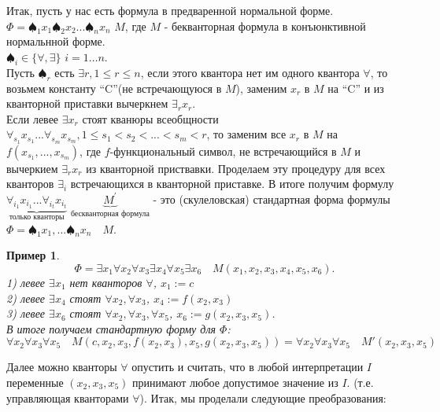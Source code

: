 \documentclass{article}
\newtheorem{example}{Пример}
\numberwithin{example}{section}
\numberwithin{question}{section}
\numberwithin{Remark}{section}
\numberwithin{theorem}{section}
\numberwithin{definition}{section}
\numberwithin{proposition}{section}
\begin{document}
Итак, пусть у нас есть формула в предваренной нормальной форме.\\
$\Phi =\spadesuit_1 x_1 \spadesuit_2 x_2 ... \spadesuit_n x_n$ $M$, где $M$ - бекванторная формула в конъюнктивной нормальнной форме.\\
$\spadesuit_i \in \{\forall , \exists\}$  $i=1\ldots n$.\\
	Пусть $\spadesuit_r$ есть $\exists r , 1\le r\le n$, если  этого квантора нет им одного квантора $\forall$, то возьмем константу ``C''(не встречающуюся в $M$), заменим $x_r$ в $M$ на ``C'' и из кванторной приставки вычеркнем $\exists_r x_r$.\\
	Если левее $\exists x_r$ стоят кванюры всеобщности $\forall_{s_1} x_{s_1}... \forall_{s_m} x_{s_m}, 1\le s_1 <s_2 <...<s_m<r$, то заменим все $x_r$ в $M$ на $f(x_{s_1},...,x_{s_m})$, где $f$-функциональный символ, не встречающийся в $M$ и вычеркием $\exists_r x_r$ из кванторной приствавки. Проделаем эту процедуру для всех кванторов $\exists_i$ встречающихся в кванторной приставке. В итоге получим формулу $\underbrace{\forall_{i_1} x_{i_1}... \forall_{i_t} x_{i_t}}_{\text{только кванторы}}$ $\underbrace{M^{'}}_{\text{бескванторная формула}}$ - это (скулеловская) стандартная форма формулы $\Phi = \spadesuit_1 x_1,...\spadesuit_n x_n\quad M$.\\
\begin{example}
	\begin{equation*}
	\Phi =\exists x_1\forall x_2\forall x_3\exists x_4\forall x_5 \exists x_6\quad M(x_1,x_2,x_3,x_4,x_5,x_6).
	\end{equation*}
	1) левее $\exists x_1$ нет кванторов $\forall$, $x_1:= c$\\
	2) левее $\exists x_4$ стоят $\forall x_2,\forall x_3$, $x_4:=f(x_2,x_3)$\\
	3) левее $\exists x_6$ стоят $\forall x_2,\forall x_3,\forall x_5$, $x_6:=g(x_2,x_3,x_5)$.\\
	В итоге получаем стандартную форму для $\Phi$:
	\begin{equation*}
	\forall x_2\forall x_3\forall x_5\quad M(c,x_2,x_3,f(x_2,x_3),x_5,g(x_2,x_3,x_5))=\forall x_2\forall x_3\forall x_5\quad M'(x_2,x_3,x_5)
	\end{equation*}
\end{example}
Далее можно кванторы $\forall $ опустить и считать, что в любой интерпретации $I$ переменные $(x_2,x_3,x_5)$ принимают любое допустимое значение из $I$. (т.е. управляющая кванторами $\forall$). Итак, мы проделали следующие преобразования: \\
\end{document}
